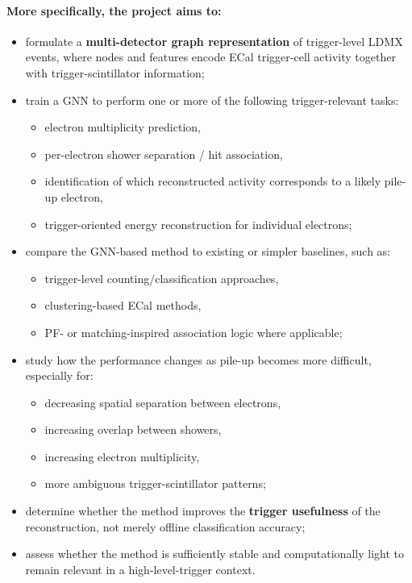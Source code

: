 \paragraph{More specifically, the project aims to:}
\begin{itemize}
    \item formulate a \textbf{multi-detector graph representation} of trigger-level LDMX events, where nodes and features encode ECal trigger-cell activity together with trigger-scintillator information;
    \item train a GNN to perform one or more of the following trigger-relevant tasks:
    \begin{itemize}
        \item electron multiplicity prediction,
        \item per-electron shower separation / hit association,
        \item identification of which reconstructed activity corresponds to a likely pile-up electron,
        \item trigger-oriented energy reconstruction for individual electrons;
    \end{itemize}
    \item compare the GNN-based method to existing or simpler baselines, such as:
    \begin{itemize}
        \item trigger-level counting/classification approaches,
        \item clustering-based ECal methods,
        \item PF- or matching-inspired association logic where applicable;
    \end{itemize}
    \item study how the performance changes as pile-up becomes more difficult, especially for:
    \begin{itemize}
        \item decreasing spatial separation between electrons,
        \item increasing overlap between showers,
        \item increasing electron multiplicity,
        \item more ambiguous trigger-scintillator patterns;
    \end{itemize}
    \item determine whether the method improves the \textbf{trigger usefulness} of the reconstruction, not merely offline classification accuracy;
    \item assess whether the method is sufficiently stable and computationally light to remain relevant in a high-level-trigger context.
\end{itemize}

